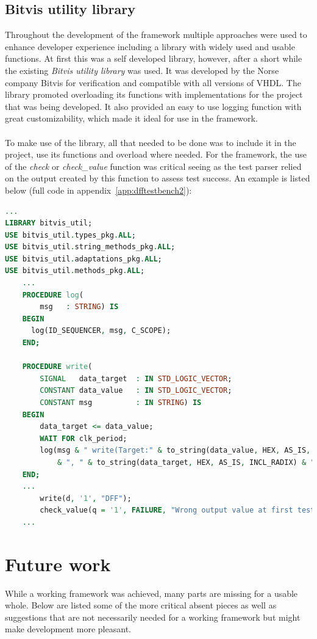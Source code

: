 \documentclass[11pt,british]{article}
\begin{document}
\subsection{Bitvis utility library}
\label{subsec:bitvis}
Throughout the development of the framework multiple approaches were used to enhance developer experience including a library with widely used and usable functions. At first this was a self developed library, however, after a short while the existing \emph{Bitvis utility library} was used. It was developed by the Norse company Bitvis for verification and compatible with all versions of \gls{VHDL}. \cite{bitvis} The library promoted overloading its functions with implementations for the project that was being developed. It also provided an easy to use logging function with great customizability, which made it ideal for use in the framework.
\\
\\
To make use of the library, all that needed to be done was to include it in the project, use its functions and overload where needed. For the framework, the use of the \emph{check} or \emph{check\_value} function was critical seeing as the test parser relied on the output created by this function to assess test success. An example is listed below (full code in appendix~\ref{app:dfftestbench2}):
\begin{lstlisting}[language=VHDL, tabsize=4, frame=single, framesep=2mm, belowskip=8pt, aboveskip=8pt, showstringspaces=false, basicstyle=\footnotesize]
...
LIBRARY bitvis_util;
USE bitvis_util.types_pkg.ALL;
USE bitvis_util.string_methods_pkg.ALL;
USE bitvis_util.adaptations_pkg.ALL;
USE bitvis_util.methods_pkg.ALL;
	...
	PROCEDURE log(
    	msg   : STRING) IS
    BEGIN
      log(ID_SEQUENCER, msg, C_SCOPE);
    END;
    
	PROCEDURE write(
    	SIGNAL   data_target  : IN STD_LOGIC_VECTOR;
    	CONSTANT data_value   : IN STD_LOGIC_VECTOR;
    	CONSTANT msg          : IN STRING) IS
    BEGIN
    	data_target <= data_value;
    	WAIT FOR clk_period;
    	log(msg & " write(Target:" & to_string(data_value, HEX, AS_IS, INCL_RADIX) 
    		& ", " & to_string(data_target, HEX, AS_IS, INCL_RADIX) & ")";);
    END;
	...
		write(d, '1', "DFF");
		check_value(q = '1', FAILURE, "Wrong output value at first test");
	...
\end{lstlisting}


\newpage{}
\section{Future work}
While a working framework was achieved, many parts are missing for a usable whole. Below are listed some of the more critical absent pieces as well as suggestions that are not necessarily needed for a working framework but might make development more pleasant.
\end{document}
